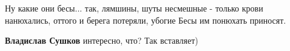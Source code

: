 \begin{itemize}
Ну какие они бесы... так, лямшины, шуты несмешные - только крови нанюхались, оттого и берега потеряли, убогие
Бесы им понюхать приносят.

\begin{itemize} %
\textbf{Владислав Сушков} интересно, что? Так вставляет)
\end{itemize} %

\end{itemize} %
